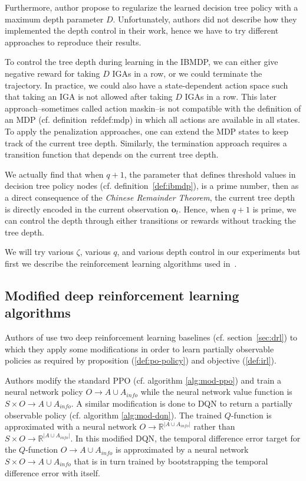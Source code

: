 Furthermore, author propose to regularize the learned decision tree policy with a maximum depth parameter $D$.
Unfortunately, authors did not describe how they implemented the depth control in their work, hence we have to try different approaches to reproduce their results.

To control the tree depth during learning in the IBMDP, we can either give negative reward for taking $D$ IGAs in a row, or we could terminate the trajectory.
In practice, we could also have a state-dependent action space such that taking an IGA is not allowed after taking $D$ IGAs in a row.
This later approach--sometimes called action maskin--is not compatible with the definition of an MDP (cf. definition~ref{def:mdp}) in which all actions are available in all states. 
To apply the penalization approaches, one can extend the MDP states to keep track of the current tree depth.
Similarly, the termination approach requires a transition function that depends on the current tree depth.

We actually find that when $q+1$, the parameter that defines threshold values in decision tree policy nodes (cf. definition~\ref{def:ibmdp}), is a prime number, then as a direct consequence of the \textit{Chinese Remainder Theorem}, the current tree depth is directly encoded in the current observation $\boldsymbol{o}_t$. 
Hence, when $q+1$ is prime, we can control the depth through either transitions or rewards without tracking the tree depth.

We will try various $\zeta$, various $q$, and various depth control in our experiments but first we describe the reinforcement learning algorithms used in~\cite{topin2021iterative}.

\subsection{Modified deep reinforcement learning algorithms}
Authors of \cite{topin2021iterative} use two deep reinforcement learning baselines (cf. section~\ref{sec:drl}) to which they apply some modifications in order to learn partially observable policies as required by proposition (\ref{def:po-policy}) and objective (\ref{def:irl}).

Authors modify the standard PPO (cf. algorithm \ref{alg:mod-ppo}) and train a neural network policy $O\rightarrow A\cup A_{info}$ while the neural network value function is $S\times O\rightarrow A\cup A_{info}$.
A similar modification is done to DQN to return a partially observable policy (cf. algorithm \ref{alg:mod-dqn}). The trained $Q$-function is approximated with a neural network $O\rightarrow \mathbb{R}^{|A\cup A_{info}|}$ rather than $S\times O\rightarrow \mathbb{R}^{|A\cup A_{info}|}$.
In this modified DQN, the temporal difference error target for the $Q$-function $O\rightarrow A\cup A_{info}$ is approximated by a neural network $S\times O\rightarrow A\cup A_{info}$ that is in turn trained by bootstrapping the temporal difference error with itself.

